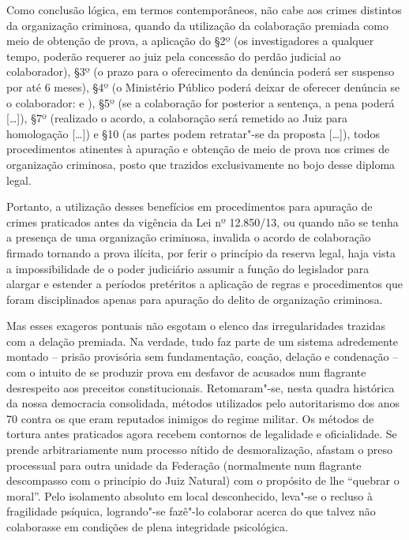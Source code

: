 Como conclusão lógica, em termos contemporâneos, não cabe aos crimes
distintos da organização criminosa, quando da utilização da colaboração
premiada como meio de obtenção de prova, a aplicação do §2º (os
investigadores a qualquer tempo, poderão requerer ao juiz pela concessão
do perdão judicial ao colaborador), §3º (o prazo para o oferecimento da
denúncia poderá ser suspenso por até 6 meses), §4º (o Ministério Público
poderá deixar de oferecer denúncia se o colaborador:  e ), §5º (se a
colaboração for posterior a sentença, a pena poderá [\ldots{}]), §7º (realizado
o acordo, a colaboração será remetido ao Juiz para homologação [\ldots{}]) e §10
(as partes podem retratar"-se da proposta [\ldots{}]), todos procedimentos
atinentes à apuração e obtenção de meio de prova nos crimes de
organização criminosa, posto que trazidos exclusivamente no bojo desse
diploma legal.

Portanto, a utilização desses benefícios em procedimentos para apuração
de crimes praticados antes da vigência da Lei nº 12.850/13, ou quando
não se tenha a presença de uma organização criminosa, invalida o acordo
de colaboração firmado tornando a prova ilícita, por ferir o princípio
da reserva legal, haja vista a impossibilidade de o poder judiciário
assumir a função do legislador para alargar e estender a períodos
pretéritos a aplicação de regras e procedimentos que foram disciplinados
apenas para apuração do delito de organização criminosa.

Mas esses exageros pontuais não esgotam o elenco das irregularidades
trazidas com a delação premiada. Na verdade, tudo faz parte de um
sistema adredemente montado -- prisão provisória sem fundamentação,
coação, delação e condenação -- com o intuito de se produzir prova em
desfavor de acusados num flagrante desrespeito aos preceitos
constitucionais. Retomaram"-se, nesta quadra histórica da nossa
democracia consolidada, métodos utilizados pelo autoritarismo dos anos
70 contra os que eram reputados inimigos do regime militar. Os métodos
de tortura antes praticados agora recebem contornos de legalidade e
oficialidade. Se prende arbitrariamente num processo nítido de
desmoralização, afastam o preso processual para outra unidade da
Federação (normalmente num flagrante descompasso com o princípio do Juiz
Natural) com o propósito de lhe ``quebrar o moral''. Pelo isolamento
absoluto em local desconhecido, leva"-se o recluso à fragilidade
psíquica, logrando"-se fazê"-lo colaborar acerca do que talvez não
colaborasse em condições de plena integridade psicológica.

